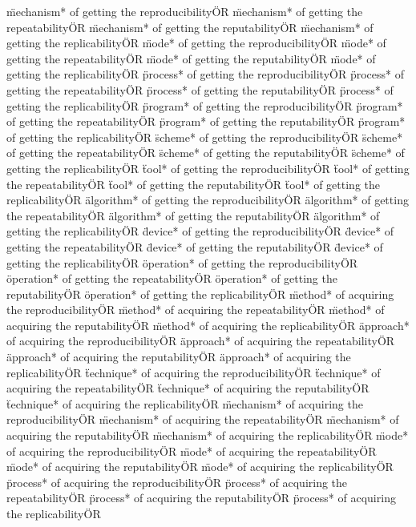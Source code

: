\documentclass[
10pt, %
a4paper, %
oneside, %
headinclude,footinclude, %
BCOR5mm, %
]{scrartcl}
\begin{document}
\"mechanism* of getting the reproducibility\" OR \"mechanism* of getting the repeatability\" OR \"mechanism* of getting the reputability\" OR \"mechanism* of getting the replicability\" OR 
\"mode* of getting the reproducibility\" OR \"mode* of getting the repeatability\" OR \"mode* of getting the reputability\" OR \"mode* of getting the replicability\" OR 
\"process* of getting the reproducibility\" OR \"process* of getting the repeatability\" OR \"process* of getting the reputability\" OR \"process* of getting the replicability\" OR 
\"program* of getting the reproducibility\" OR \"program* of getting the repeatability\" OR \"program* of getting the reputability\" OR \"program* of getting the replicability\" OR 
\"scheme* of getting the reproducibility\" OR \"scheme* of getting the repeatability\" OR \"scheme* of getting the reputability\" OR \"scheme* of getting the replicability\" OR 
\"tool* of getting the reproducibility\" OR \"tool* of getting the repeatability\" OR \"tool* of getting the reputability\" OR \"tool* of getting the replicability\" OR 
\"algorithm* of getting the reproducibility\" OR \"algorithm* of getting the repeatability\" OR \"algorithm* of getting the reputability\" OR \"algorithm* of getting the replicability\" OR 
\"device* of getting the reproducibility\" OR \"device* of getting the repeatability\" OR \"device* of getting the reputability\" OR \"device* of getting the replicability\" OR 
\"operation* of getting the reproducibility\" OR \"operation* of getting the repeatability\" OR \"operation* of getting the reputability\" OR \"operation* of getting the replicability\" OR 
\"method* of acquiring the reproducibility\" OR \"method* of acquiring the repeatability\" OR \"method* of acquiring the reputability\" OR \"method* of acquiring the replicability\" OR 
\"approach* of acquiring the reproducibility\" OR \"approach* of acquiring the repeatability\" OR \"approach* of acquiring the reputability\" OR \"approach* of acquiring the replicability\" OR 
\"technique* of acquiring the reproducibility\" OR \"technique* of acquiring the repeatability\" OR \"technique* of acquiring the reputability\" OR \"technique* of acquiring the replicability\" OR 
\"mechanism* of acquiring the reproducibility\" OR \"mechanism* of acquiring the repeatability\" OR \"mechanism* of acquiring the reputability\" OR \"mechanism* of acquiring the replicability\" OR 
\"mode* of acquiring the reproducibility\" OR \"mode* of acquiring the repeatability\" OR \"mode* of acquiring the reputability\" OR \"mode* of acquiring the replicability\" OR 
\"process* of acquiring the reproducibility\" OR \"process* of acquiring the repeatability\" OR \"process* of acquiring the reputability\" OR \"process* of acquiring the replicability\" OR 
\end{document}
